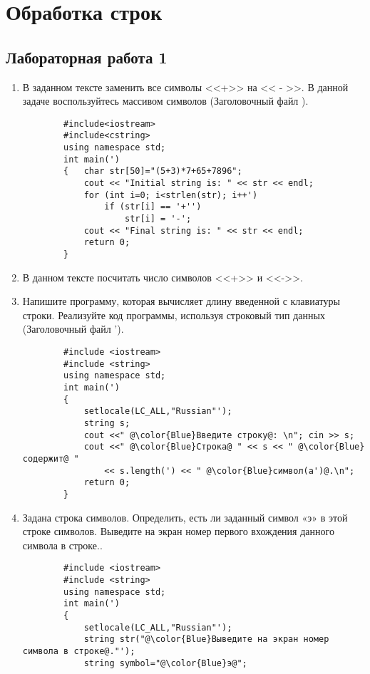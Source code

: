 \chapter{Обработка строк}
\section{Лабораторная работа 1}
\begin{enumerate}[leftmargin=*]
    \item В заданном тексте заменить все символы <<+>> на << - >>. В данной задаче воспользуйтесь массивом символов (Заголовочный файл ).
    \begin{lstlisting}
        #include<iostream>
        #include<cstring>
        using namespace std;
        int main(')
        {   char str[50]="(5+3)*7+65+7896";
            cout << "Initial string is: " << str << endl;
            for (int i=0; i<strlen(str); i++')
                if (str[i] == '+'')
                    str[i] = '-';
            cout << "Final string is: " << str << endl;
            return 0;
        }
    \end{lstlisting}
    \item В данном тексте посчитать число символов <<+>> и <<->>.
    \item Напишите программу, которая вычисляет длину введенной с клавиатуры строки. Реализуйте код программы, используя строковый тип данных (Заголовочный файл ').
    \begin{lstlisting}
        #include <iostream>
        #include <string>
        using namespace std;
        int main(')
        {
            setlocale(LC_ALL,"Russian"');
            string s;
            cout <<" @\color{Blue}Введите строку@: \n"; cin >> s;
            cout <<" @\color{Blue}Строка@ " << s << " @\color{Blue}содержит@ "
                << s.length(') << " @\color{Blue}символ(а')@.\n";
            return 0;
        }
    \end{lstlisting}
    \item Задана строка символов. Определить, есть ли заданный символ «э» в этой строке символов. Выведите на экран номер первого вхождения данного символа в строке..
    \begin{lstlisting}
        #include <iostream>
        #include <string>
        using namespace std;
        int main(')
        {
            setlocale(LC_ALL,"Russian"');
            string str("@\color{Blue}Выведите на экран номер символа в строке@."');
            string symbol="@\color{Blue}э@";

\end{lstlisting}
\end{enumerate}
